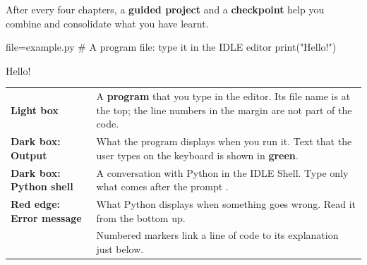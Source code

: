 After every four chapters, a \textbf{guided project} and a \textbf{checkpoint} help you combine and
consolidate what you have learnt.

\clearpage
{}
\begin{code}{file=example.py}
# A program file: type it in the IDLE editor
print("Hello!")
\end{code}
\begin{sortie}
Hello!
\end{sortie}
\begin{tcolorbox}[otBase,colback=white,colframe=otRule,boxrule=0.5pt]
\begin{tabularx}{\linewidth}{@{}>{\RaggedRight\arraybackslash}p{30mm}@{\hspace{5mm}}Y@{}}
\textbf{Light box} & A \textbf{program} that you type in the editor. Its file name is at the top;
  the line numbers in the margin are not part of the code.\\[2.4mm]
\textbf{Dark box: Output} & What the program displays when you run it. Text that the user types on
  the keyboard is shown in {\color{otGreenDark}\ttfamily\bfseries green}.\\[2.4mm]
\textbf{Dark box: Python shell} & A conversation with Python in the IDLE Shell. Type only what comes
  after the prompt \py{>>>}.\\[2.4mm]
\textbf{Red edge: Error message} & What Python displays when something goes wrong. Read it from the
  bottom up.\\[2.4mm]
\hspace{1mm} & Numbered markers link a line of code to its explanation
  just below.\\
\end{tabularx}
\end{tcolorbox}

